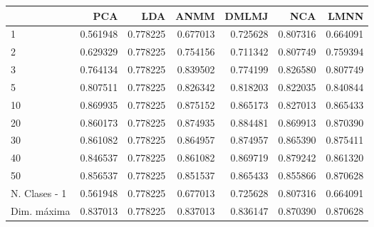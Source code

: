 \begin{tabular}{lrrrrrr}
\toprule
{} &       PCA &       LDA &      ANMM &     DMLMJ &       NCA &      LMNN \\
\midrule
1             &  0.561948 &  0.778225 &  0.677013 &  0.725628 &  0.807316 &  0.664091 \\
2             &  0.629329 &  0.778225 &  0.754156 &  0.711342 &  0.807749 &  0.759394 \\
3             &  0.764134 &  0.778225 &  0.839502 &  0.774199 &  0.826580 &  0.807749 \\
5             &  0.807511 &  0.778225 &  0.826342 &  0.818203 &  0.822035 &  0.840844 \\
10            &  0.869935 &  0.778225 &  0.875152 &  0.865173 &  0.827013 &  0.865433 \\
20            &  0.860173 &  0.778225 &  0.874935 &  0.884481 &  0.869913 &  0.870390 \\
30            &  0.861082 &  0.778225 &  0.864957 &  0.874957 &  0.865390 &  0.875411 \\
40            &  0.846537 &  0.778225 &  0.861082 &  0.869719 &  0.879242 &  0.861320 \\
50            &  0.856537 &  0.778225 &  0.851537 &  0.865433 &  0.855866 &  0.870628 \\
N. Clases - 1 &  0.561948 &  0.778225 &  0.677013 &  0.725628 &  0.807316 &  0.664091 \\
Dim. máxima   &  0.837013 &  0.778225 &  0.837013 &  0.836147 &  0.870390 &  0.870628 \\
\bottomrule
\end{tabular}
